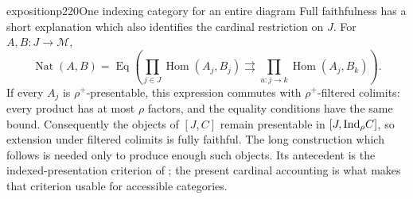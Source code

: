 \begin{dcomment}{exposition}{p220}{One indexing category for an entire diagram}
Full faithfulness has a short explanation which also identifies the cardinal restriction on $J$.  For $A,B:J\to\mathcal M$,
\[
 \operatorname{Nat}(A,B)=
 \operatorname{Eq}\left(
 \prod_{j\in J}\operatorname{Hom}(A_j,B_j)
 \rightrightarrows
 \prod_{u:j\to k}\operatorname{Hom}(A_j,B_k)
 \right).
\]
If every $A_j$ is $\rho^+$-presentable, this expression commutes with $\rho^+$-filtered colimits: every product has at most $\rho$ factors, and the equality conditions have the same bound.  Consequently the objects of $[J,C]$ remain presentable in $[J,\mathrm{Ind}_\rho C]$, so extension under filtered colimits is fully faithful.  The long construction which follows is needed only to produce enough such objects.  Its antecedent is the indexed-presentation criterion of \citet[I, 8.8.2--8.8.3]{SGA4I1972}; the present cardinal accounting is what makes that criterion usable for accessible categories.
\end{dcomment}


